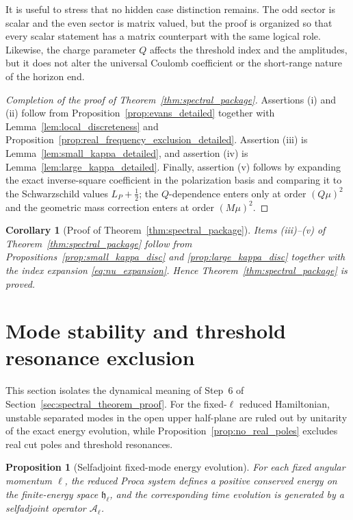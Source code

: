 \documentclass[12pt]{article}
\numberwithin{equation}{section}
\theoremstyle{plain}
\newtheorem{proposition}[theorem]{Proposition}
\newtheorem{corollary}[theorem]{Corollary}
\theoremstyle{definition}
\theoremstyle{remark}
\newcommand{\cA}{\mathcal A}
\begin{document}
It is useful to stress that no hidden case distinction remains.  The odd sector is scalar and the even sector is matrix valued, but the proof is organized so that every scalar statement has a matrix counterpart with the same logical role.  Likewise, the charge parameter $Q$ affects the threshold index and the amplitudes, but it does not alter the universal Coulomb coefficient or the short-range nature of the horizon end.

\begin{proof}[Completion of the proof of Theorem~\ref{thm:spectral_package}]
Assertions \textnormal{(i)} and \textnormal{(ii)} follow from Proposition~\ref{prop:evans_detailed} together with Lemma~\ref{lem:local_discreteness} and Proposition~\ref{prop:real_frequency_exclusion_detailed}.  Assertion \textnormal{(iii)} is Lemma~\ref{lem:small_kappa_detailed}, and assertion \textnormal{(iv)} is Lemma~\ref{lem:large_kappa_detailed}.  Finally, assertion \textnormal{(v)} follows by expanding the exact inverse-square coefficient in the polarization basis and comparing it to the Schwarzschild values $L_P+\frac12$; the $Q$-dependence enters only at order $(Q\mu)^2$ and the geometric mass correction enters at order $(M\mu)^2$.
\end{proof}


\begin{corollary}[Proof of Theorem~\ref{thm:spectral_package}]\label{cor:spectral_package_complete}
Items \textnormal{(iii)}--\textnormal{(v)} of Theorem~\ref{thm:spectral_package} follow from Propositions~\ref{prop:small_kappa_disc} and \ref{prop:large_kappa_disc} together with the index expansion \eqref{eq:nu_expansion}.  Hence Theorem~\ref{thm:spectral_package} is proved.
\end{corollary}

\section{Mode stability and threshold resonance exclusion}\label{sec:mode_stability}

This section isolates the dynamical meaning of Step~6 of Section~\ref{sec:spectral_theorem_proof}.  For the fixed-$\ell$ reduced Hamiltonian, unstable separated modes in the open upper half-plane are ruled out by unitarity of the exact energy evolution, while Proposition~\ref{prop:no_real_poles} excludes real cut poles and threshold resonances.

\begin{proposition}[Selfadjoint fixed-mode energy evolution]\label{prop:selfadjoint_generator}
For each fixed angular momentum $\ell$, the reduced Proca system defines a positive conserved energy on the finite-energy space $\mathfrak h_\ell$, and the corresponding time evolution is generated by a selfadjoint operator $\cA_\ell$.
\end{proposition}
\end{document}
